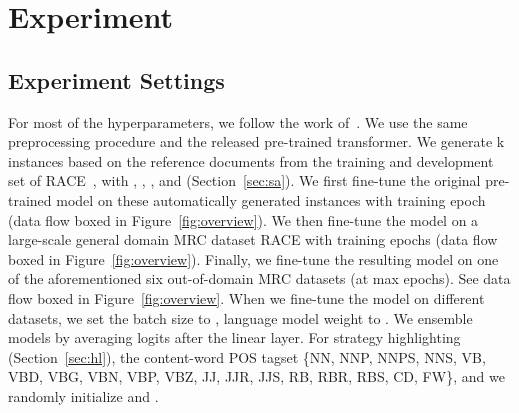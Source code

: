 \documentclass[11pt,a4paper]{article}
\begin{document}
 




 \section{Experiment}
\label{sec:experiment}

\subsection{Experiment Settings}
For most of the hyperparameters, we follow the work of~. We use the same preprocessing procedure and the released pre-trained transformer. We generate k instances based on the reference documents from the training and development set of RACE~\cite{lai2017race}, with , , , and  (Section~\ref{sec:sa}). We first fine-tune the original pre-trained model on these automatically generated instances with  training epoch (data flow  boxed in Figure~\ref{fig:overview}). We then fine-tune the model on a large-scale general domain MRC dataset RACE with  training epochs (data flow  boxed in Figure~\ref{fig:overview}). Finally, we fine-tune the resulting model on one of the aforementioned six out-of-domain MRC datasets (at max  epochs). See data flow  boxed in Figure~\ref{fig:overview}. When we fine-tune the model on different datasets, we set the batch size to , language model weight  to . We ensemble models by averaging logits after the linear layer. For strategy highlighting (Section~\ref{sec:hl}), the content-word POS tagset  \{NN, NNP, NNPS, NNS, VB, VBD, VBG, VBN, VBP, VBZ, JJ, JJR, JJS, RB, RBR, RBS, CD, FW\}, and we randomly initialize  and . 
\end{document}

